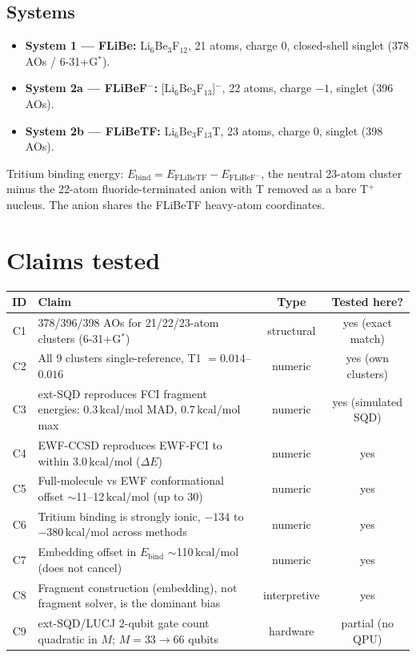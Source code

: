 \documentclass[11pt]{article}
\newcommand{\kcal}{\,\mathrm{kcal/mol}}
\begin{document}
\subsection*{Systems}
\begin{itemize}[nosep]
  \item \textbf{System 1 --- FLiBe:} Li$_6$Be$_3$F$_{12}$, 21 atoms, charge 0, closed-shell singlet (378 AOs / 6-31+G$^*$).
  \item \textbf{System 2a --- FLiBeF$^-$:} [Li$_6$Be$_3$F$_{13}$]$^-$, 22 atoms, charge $-1$, singlet (396 AOs).
  \item \textbf{System 2b --- FLiBeTF:} Li$_6$Be$_3$F$_{13}$T, 23 atoms, charge 0, singlet (398 AOs).
\end{itemize}
Tritium binding energy: $E_{\mathrm{bind}} = E_{\mathrm{FLiBeTF}} - E_{\mathrm{FLiBeF^-}}$,
the neutral 23-atom cluster minus the 22-atom fluoride-terminated anion with T removed as a
bare T$^+$ nucleus. The anion shares the FLiBeTF heavy-atom coordinates.

\section{Claims tested}
\begin{longtable}{clcc}
\toprule
ID & Claim & Type & Tested here? \\
\midrule
C1 & 378/396/398 AOs for 21/22/23-atom clusters (6-31+G$^*$) & structural & yes (exact match) \\
C2 & All 9 clusters single-reference, T1 $=0.014$--$0.016$ & numeric & yes (own clusters) \\
C3 & ext-SQD reproduces FCI fragment energies: $0.3\kcal$ MAD, $0.7\kcal$ max & numeric & yes (simulated SQD) \\
C4 & EWF-CCSD reproduces EWF-FCI to within $3.0\kcal$ ($\Delta E$) & numeric & yes \\
C5 & Full-molecule vs EWF conformational offset $\sim$11--12$\kcal$ (up to 30) & numeric & yes \\
C6 & Tritium binding is strongly ionic, $-134$ to $-380\kcal$ across methods & numeric & yes \\
C7 & Embedding offset in $E_{\mathrm{bind}}$ $\sim$110$\kcal$ (does not cancel) & numeric & yes \\
C8 & Fragment construction (embedding), not fragment solver, is the dominant bias & interpretive & yes \\
C9 & ext-SQD/LUCJ 2-qubit gate count quadratic in $M$; $M=33\to$66 qubits & hardware & partial (no QPU) \\
\bottomrule
\end{longtable}
\end{document}
